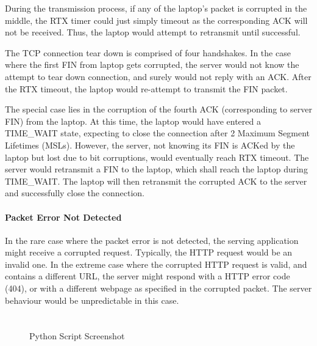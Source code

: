 \documentclass[12pt]{article}
\begin{document}
During the transmission process, if any of the laptop's packet is corrupted in the middle, the RTX timer could just simply timeout as the corresponding ACK will not be received. Thus, the laptop would attempt to retransmit until successful.

The TCP connection tear down is comprised of four handshakes. In the case where the first FIN from laptop gets corrupted, the server would not know the attempt to tear down connection, and surely would not reply with an ACK. After the RTX timeout, the laptop would re-attempt to transmit the FIN packet.

The special case lies in the corruption of the fourth ACK (corresponding to server FIN) from the laptop. At this time, the laptop would have entered a TIME\_WAIT state, expecting to close the connection after 2 Maximum Segment Lifetimes (MSLs). However, the server, not knowing its FIN is ACKed by the laptop but lost due to bit corruptions, would eventually reach RTX timeout. The server would retransmit a FIN to the laptop, which shall reach the laptop during TIME\_WAIT. The laptop will then retransmit the corrupted ACK to the server and successfully close the connection.

\paragraph{Packet Error Not Detected}

In the rare case where the packet error is not detected, the serving application might receive a corrupted request. Typically, the HTTP request would be an invalid one. In the extreme case where the corrupted HTTP request is valid, and contains a different URL, the server might respond with a HTTP error code (404), or with a different webpage as specified in the corrupted packet. The server behaviour would be unpredictable in this case.


\section{}

\renewcommand{\thesubsection}{\thesection.\alph{subsection}}

\subsection{}

\begin{figure}[h!]
  \caption{Python Script Screenshot}
  \label{fig:python-screenshot}
\end{figure}
\end{document}
